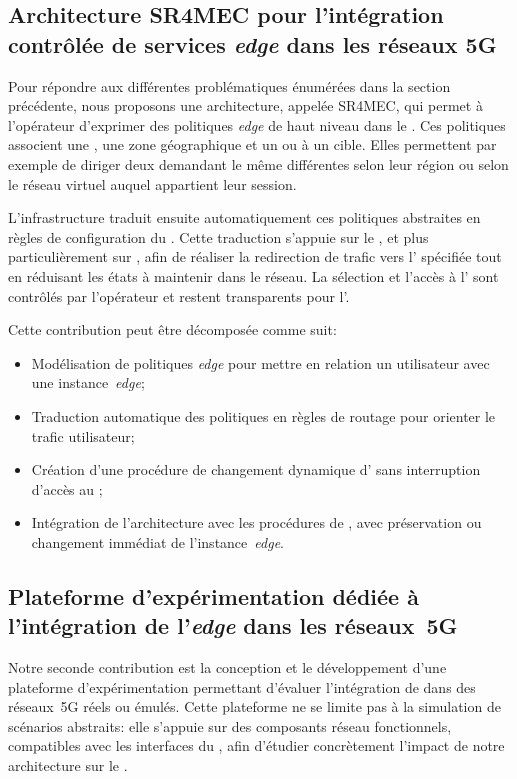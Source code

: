 \documentclass[../main.tex]{subfiles}
\begin{document}
\subsection*{Architecture SR4MEC pour l’intégration contrôlée de services \textit{edge} dans les réseaux 5G}
Pour répondre aux différentes problématiques énumérées dans la section précédente, nous proposons une architecture, appelée SR4MEC, qui permet à l’opérateur d’exprimer des politiques \textit{edge} de haut niveau dans le .
Ces politiques associent une , une zone géographique et un  ou à un  cible.
Elles permettent par exemple de diriger deux  demandant le même  différentes selon leur région ou selon le réseau virtuel auquel appartient leur session.

L’infrastructure traduit ensuite automatiquement ces politiques abstraites en règles de configuration du .
Cette traduction s’appuie sur le , et plus particulièrement sur , afin de réaliser la redirection de trafic vers l’ spécifiée tout en réduisant les états à maintenir dans le réseau.
La sélection et l’accès à l’ sont contrôlés par l’opérateur et restent transparents pour l’.

Cette contribution peut être décomposée comme suit:
\begin{itemize}
    \item Modélisation de politiques \textit{edge} pour mettre en relation un utilisateur avec une instance~\textit{edge};
    \item Traduction automatique des politiques en règles de routage  pour orienter le trafic utilisateur;
    \item Création d’une procédure de changement dynamique d’ sans interruption d’accès au ;
    \item Intégration de l’architecture avec les procédures de , avec préservation ou changement immédiat de l’instance~\textit{edge}.
\end{itemize}

\pagebreak
\begingroup
\setlength{\parskip}{1.5em}
\subsection*{Plateforme d’expérimentation dédiée à l’intégration de l’\textit{edge} dans les réseaux~5G}
Notre seconde contribution est la conception et le développement d’une plateforme d’expérimentation permettant d’évaluer l'intégration de  dans des réseaux~5G réels ou émulés.
Cette plateforme ne se limite pas à la simulation de scénarios abstraits: elle s’appuie sur des composants réseau fonctionnels, compatibles avec les interfaces du , afin d'étudier concrètement l’impact de notre architecture sur le .
\end{document}
